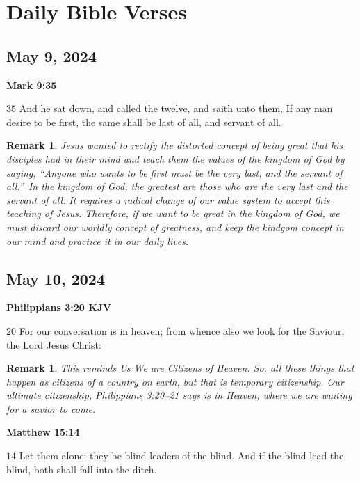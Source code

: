 \documentclass{article}
\newtheorem{remark}[theorem]{Remark}
\begin{document}
\tableofcontents

\section{Daily Bible Verses}

\subsection{\protect\bigskip May 9, 2024}

\textbf{Mark 9:35}

$35$ And he sat down, and called the twelve, and saith unto them, If any man
desire to be first, the same shall be last of all, and servant of all.

\begin{remark}
Jesus wanted to rectify the distorted concept of being great that his
disciples had in their mind and teach them the values of the kingdom of God
by saying, \textquotedblleft Anyone who wants to be first must be the very
last, and the servant of all.\textquotedblright\ In the kingdom of God, the
greatest are those who are the very last and the servant of all. It requires
a radical change of our value system to accept this teaching of Jesus.
Therefore, if we want to be great in the kingdom of God, we must discard our
worldly concept of greatness, and keep the kindgom concept in our mind and
practice it in our daily lives.
\end{remark}

\bigskip 

\subsection{\protect\bigskip May 10, 2024}

\textbf{Philippians 3:20 KJV}

$20$ For our conversation is in heaven; from whence also we look for the
Saviour, the Lord Jesus Christ:

\begin{remark}
This reminds Us We are Citizens of Heaven. So, all these things that happen
as citizens of a country on earth, but that is temporary citizenship. Our
ultimate citizenship, Philippians 3:20--21 says is in Heaven, where we are
waiting for a savior to come.
\end{remark}

\textbf{Matthew 15:14}

$14$ Let them alone: they be blind leaders of the blind. And if the blind
lead the blind, both shall fall into the ditch.
\end{document}
